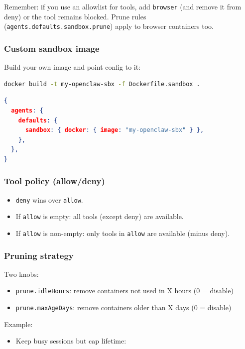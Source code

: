 Remember: if you use an allowlist for tools, add \texttt{browser} (and remove it from
deny) or the tool remains blocked.
Prune rules (\texttt{agents.defaults.sandbox.prune}) apply to browser containers too.

\subsubsection{Custom sandbox image}


Build your own image and point config to it:

\begin{lstlisting}[language=bash]
docker build -t my-openclaw-sbx -f Dockerfile.sandbox .
\end{lstlisting}


\begin{lstlisting}[language=json]
{
  agents: {
    defaults: {
      sandbox: { docker: { image: "my-openclaw-sbx" } },
    },
  },
}
\end{lstlisting}


\subsubsection{Tool policy (allow/deny)}


\begin{itemize}
  \item \texttt{deny} wins over \texttt{allow}.
  \item If \texttt{allow} is empty: all tools (except deny) are available.
  \item If \texttt{allow} is non-empty: only tools in \texttt{allow} are available (minus deny).
\end{itemize}


\subsubsection{Pruning strategy}


Two knobs:

\begin{itemize}
  \item \texttt{prune.idleHours}: remove containers not used in X hours (0 = disable)
  \item \texttt{prune.maxAgeDays}: remove containers older than X days (0 = disable)
\end{itemize}


Example:

\begin{itemize}
  \item Keep busy sessions but cap lifetime:
\end{itemize}


